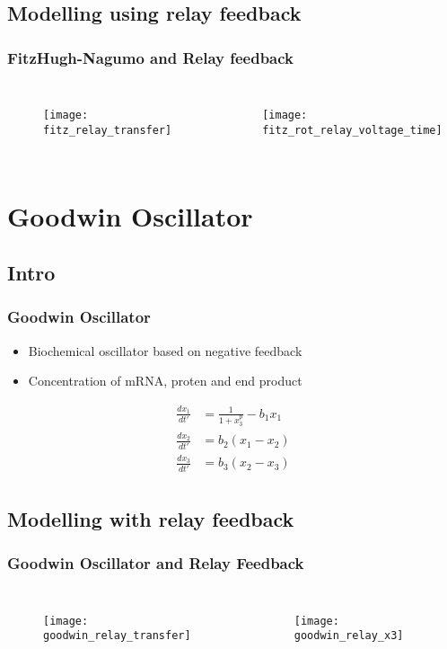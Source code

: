 \documentclass[11pt]{beamer}
\begin{document}
\subsection{Modelling using relay feedback}
\begin{frame}
\frametitle{FitzHugh-Nagumo and Relay feedback}
\begin{columns}
\begin{figure}
		        \texttt{[image: fitz\_relay\_transfer]}
\end{figure}
\begin{figure}
\texttt{[image: fitz\_rot\_relay\_voltage\_time]}
\end{figure}
\end{columns}
\end{frame}


\section{Goodwin Oscillator}
\subsection{Intro}
\begin{frame}
\frametitle{Goodwin Oscillator}

\begin{itemize}
\item Biochemical oscillator based on negative feedback
\item Concentration of mRNA, proten and end product
\end{itemize}

\begin{align*}
\frac{dx_1}{dt'} &= \frac{1}{1 + x_3^p} - b_1x_1 \\
\frac{dx_2}{dt'} &= b_2(x_1 - x_2) \\
\frac{dx_3}{dt'} &= b_3(x_2 - x_3) \\
\end{align*}
\end{frame}

\subsection{Modelling with relay feedback}
\begin{frame}
\frametitle{Goodwin Oscillator and Relay Feedback}
\begin{columns}
\begin{figure}
\texttt{[image: goodwin\_relay\_transfer]}
\end{figure}
\begin{figure}
\texttt{[image: goodwin\_relay\_x3]}
\end{figure}
\end{columns}
\end{frame}
\end{document}
